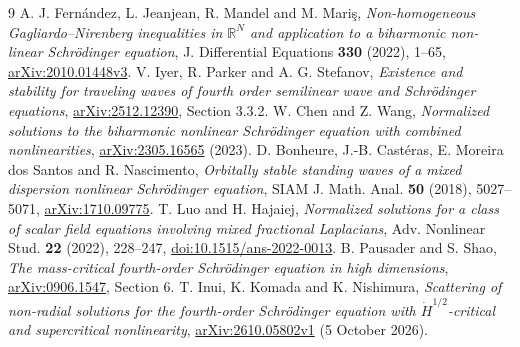\documentclass[11pt,a4paper]{article}
\theoremstyle{remark}\newtheorem{remark}[theorem]{Remark}
\begin{document}
\appendix




\begin{thebibliography}{9}
 A. J. Fern\'andez, L. Jeanjean, R. Mandel and M. Mari\c{s}, \emph{Non-homogeneous Gagliardo--Nirenberg inequalities in $\mathbb R^N$ and application to a biharmonic non-linear Schr\"odinger equation}, J. Differential Equations \textbf{330} (2022), 1--65, \href{https://arxiv.org/abs/2010.01448}{arXiv:2010.01448v3}.
 V. Iyer, R. Parker and A. G. Stefanov, \emph{Existence and stability for traveling waves of fourth order semilinear wave and Schr\"odinger equations}, \href{https://arxiv.org/abs/2512.12390}{arXiv:2512.12390}, Section 3.3.2.
 W. Chen and Z. Wang, \emph{Normalized solutions to the biharmonic nonlinear Schr\"odinger equation with combined nonlinearities}, \href{https://arxiv.org/abs/2305.16565}{arXiv:2305.16565} (2023).
 D. Bonheure, J.-B. Cast\'eras, E. Moreira dos Santos and R. Nascimento, \emph{Orbitally stable standing waves of a mixed dispersion nonlinear Schr\"odinger equation}, SIAM J. Math. Anal. \textbf{50} (2018), 5027--5071, \href{https://arxiv.org/abs/1710.09775}{arXiv:1710.09775}.
 T. Luo and H. Hajaiej, \emph{Normalized solutions for a class of scalar field equations involving mixed fractional Laplacians}, Adv. Nonlinear Stud. \textbf{22} (2022), 228--247, \href{https://doi.org/10.1515/ans-2022-0013}{doi:10.1515/ans-2022-0013}.
 B. Pausader and S. Shao, \emph{The mass-critical fourth-order Schr\"odinger equation in high dimensions}, \href{https://arxiv.org/abs/0906.1547}{arXiv:0906.1547}, Section 6.
 T. Inui, K. Komada and K. Nishimura, \emph{Scattering of non-radial solutions for the fourth-order Schr\"odinger equation with $\dot H^{1/2}$-critical and supercritical nonlinearity}, \href{https://arxiv.org/abs/2610.05802}{arXiv:2610.05802v1} (5 October 2026).
\end{thebibliography}
\end{document}

